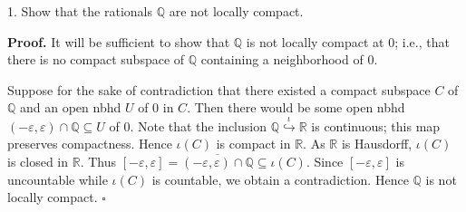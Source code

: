 \documentclass[a4paper]{article}
\newcommand{\R}{\mathbb{R}}
\newcommand{\Q}{\mathbb{Q}}
\begin{document}
1. Show that the rationals $\Q$ are not locally compact.

\textbf{Proof.} It will be sufficient to show that $\Q$ is not locally compact at $0$; i.e., that there is no compact subspace of $\Q$ containing a neighborhood of $0$.

Suppose for the sake of contradiction that there existed a compact subspace $C$ of $\Q$ and an open nbhd $U$ of $0$ in $C$. Then there would be some open nbhd $(-\varepsilon, \varepsilon) \cap \Q \subseteq U$ of $0$. Note that the inclusion $\Q \overset{\iota}{\hookrightarrow} \R$ is continuous; this map preserves compactness. Hence $\iota(C)$ is compact in $\R$. As $\R$ is Hausdorff, $\iota(C)$ is closed in $\R$. Thus $[-\varepsilon, \varepsilon] = \overline{(-\varepsilon, \varepsilon) \cap \Q} \subseteq \iota(C)$. Since $[-\varepsilon, \varepsilon]$ is uncountable while $\iota(C)$ is countable, we obtain a contradiction. Hence $\Q$ is not locally compact. $\square$
\end{document}
